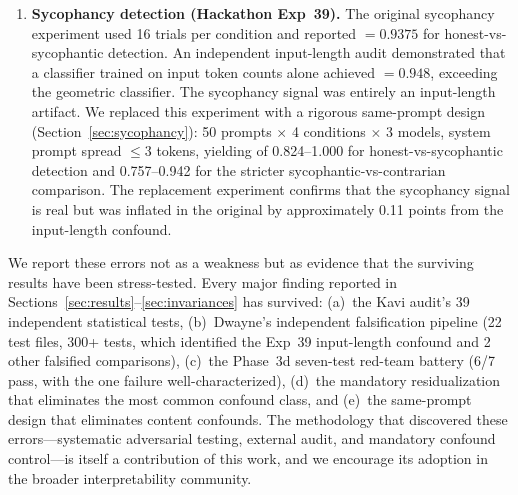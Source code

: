 \begin{enumerate}[leftmargin=2em]
  \item \textbf{Sycophancy detection (Hackathon Exp~39).}
  The original sycophancy experiment used 16 trials per condition and reported \auroc $= 0.9375$ for honest-vs-sycophantic detection.
  An independent input-length audit \cite{dwayne_audit} demonstrated that a classifier trained on input token counts alone achieved \auroc $= 0.948$, exceeding the geometric classifier.
  The sycophancy signal was entirely an input-length artifact.
  We replaced this experiment with a rigorous same-prompt design (Section~\ref{sec:sycophancy}): 50 prompts $\times$ 4 conditions $\times$ 3 models, system prompt spread $\leq 3$ tokens, yielding \fwl \auroc of 0.824--1.000 for honest-vs-sycophantic detection and 0.757--0.942 for the stricter sycophantic-vs-contrarian comparison.
  The replacement experiment confirms that the sycophancy signal is real but was inflated in the original by approximately 0.11 \auroc points from the input-length confound.
\end{enumerate}

We report these errors not as a weakness but as evidence that the surviving results have been stress-tested.
Every major finding reported in Sections~\ref{sec:results}--\ref{sec:invariances} has survived: (a)~the Kavi audit's 39 independent statistical tests, (b)~Dwayne's independent falsification pipeline \cite{dwayne_audit} (22 test files, 300+ tests, which identified the Exp~39 input-length confound and 2 other falsified comparisons), (c)~the Phase~3d seven-test red-team battery (6/7 pass, with the one failure well-characterized), (d)~the mandatory \fwl residualization that eliminates the most common confound class, and (e)~the same-prompt design that eliminates content confounds.
The methodology that discovered these errors---systematic adversarial testing, external audit, and mandatory confound control---is itself a contribution of this work, and we encourage its adoption in the broader interpretability community.
